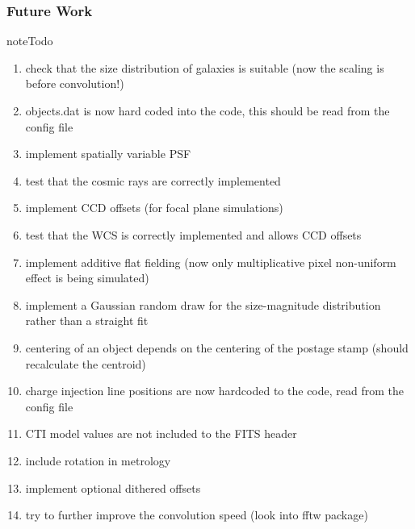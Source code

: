 \documentclass[a4paper,12pt,english]{sphinxmanual}
\begin{document}
\subsubsection{Future Work}
\label{simulator:future-work}
\begin{notice}{note}{Todo}
\begin{enumerate}
\item {} 
check that the size distribution of galaxies is suitable (now the scaling is before convolution!)

\item {} 
objects.dat is now hard coded into the code, this should be read from the config file

\item {} 
implement spatially variable PSF

\item {} 
test that the cosmic rays are correctly implemented

\item {} 
implement CCD offsets (for focal plane simulations)

\item {} 
test that the WCS is correctly implemented and allows CCD offsets

\item {} 
implement additive flat fielding (now only multiplicative pixel non-uniform effect is being simulated)

\item {} 
implement a Gaussian random draw for the size-magnitude distribution rather than a straight fit

\item {} 
centering of an object depends on the centering of the postage stamp (should recalculate the centroid)

\item {} 
charge injection line positions are now hardcoded to the code, read from the config file

\item {} 
CTI model values are not included to the FITS header

\item {} 
include rotation in metrology

\item {} 
implement optional dithered offsets

\item {} 
try to further improve the convolution speed (look into fftw package)

\end{enumerate}
\end{notice}
\end{document}
